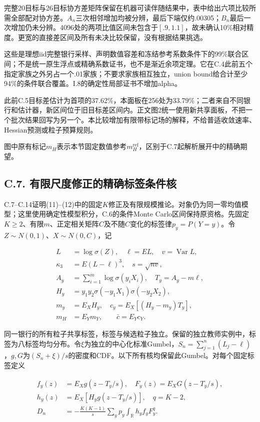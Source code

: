 \documentclass[11pt,a4paper]{article}
\begin{document}
完整20目标与26目标协方差矩阵保留在机器可读伴随结果中，表中给出六项比较所需全部配对协方差。\(A_n\)三次相邻增加均被分辨，最后下端仅约.00305；\(B_n\)最后一次增加仍未分辨。4096处的两项比值区间未包含于\([.9,1.1]\)，故未确认10\%相对精度。更宽的直接差区间及所有未决比较保留，没有根据结果挑选。

这些是理想iid完整银行采样、声明数值容差和冻结参考系数条件下的99\%联合区间；不是统一原生浮点或精确系数证书，也不是渐近余项定理。它在C.4此前五个指定家族之外另占一个.01家族；不要求家族相互独立，union
bound给合计至少94\%的条件联合覆盖。I.8的确定性局部证书不增加alpha。

此前C.5目标差估计为首项的37.62\%，本面板在256处为33.79\%；二者来自不同银行和估计器，新区间位于旧目标差区间内。正文图2统一使用新共享面板，不把一个批次结果回写为另一个。本比较增加有限带标记场的解释，不给普适收敛速率、Hessian预测或粒子预算规则。

图中原有标记\(m_H\)表示本节固定数值参考\(m_H^{\mathrm{ref}}\)，区别于C.7起解析展开中的精确期望。

\subsection*{C.7. 有限尺度修正的精确标签条件核}\label{fixed-k-correction}

C.7--C.14证明(11)--(12)中的固定\(K\)修正及有限规模推论。对象仍为同一零均值模型；这里使用确定性模型积分，C.6的条件Monte
Carlo区间保持原资格。先固定\(K\ge2\)、有限\(m\)、正定相关矩阵\(C\)及不随\(C\)变化的标签律\(p_y=P(Y=y)\)。令\(Z\sim N(0,1)\)、\(X\sim N(0,C)\)，记

\[
\begin{aligned}
L&=\log\sigma(Z),\quad \ell=EL,\quad v=\operatorname{Var}L,\\
\kappa_3&=E(L-\ell)^3,\quad s=\sqrt{nv},\\
A_y&=\sum_{i=1}^m\log\sigma(y_iX_i),\quad T_y=A_y-m\ell,\\
H_y&=y_1y_2\sigma(-y_1X_1)\sigma(-y_2X_2),\\
m_y&=E_XH_y,\quad c_y=E_X[(H_y-m_y)T_y],\\
m_H&=E_Ym_Y,\qquad \bar c=E_Yc_Y.
\end{aligned}
\tag{C.19}
\]

同一银行的所有粒子共享标签，标签与候选粒子独立。保留的独立教师实例中，标签为八标签均匀分布。令\(\xi\)为独立的中心化标准Gumbel，\(S_n=\sum_{j=1}^n(L_j-\ell)\)，\(g,G\)为\((S_n+\xi)/s\)的密度和CDF。以下所有核均保留此Gumbel。对每个固定标签定义

\[
\begin{aligned}
f_y(z)&=E_Xg(z-T_y/s),\quad F_y(z)=E_XG(z-T_y/s),\\
h_y(z)&=E_X[H_yg(z-T_y/s)],\quad q=K-2,\\
D_n&=-\frac{K(K-1)}s\sum_yp_y\int_{\mathbb R}h_yf_yF_y^q.
\end{aligned}
\tag{C.20}
\]
\end{document}
